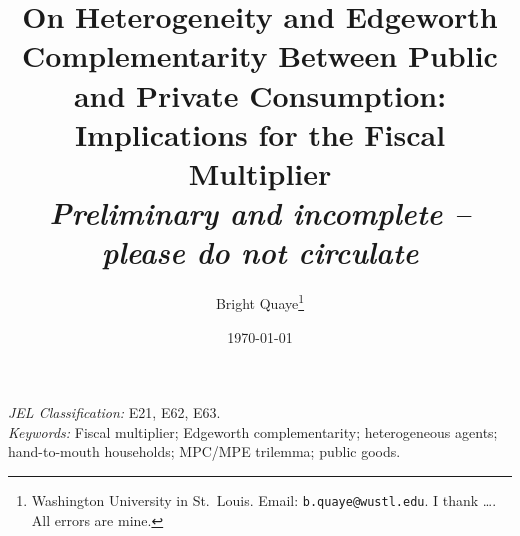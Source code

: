 \documentclass[11pt,letterpaper]{article}
\title{\textbf{On Heterogeneity and Edgeworth Complementarity Between
Public and Private Consumption:\\ Implications for the Fiscal Multiplier}\\[4pt]
\large\textit{Preliminary and incomplete -- please do not circulate}}
\author{Bright Quaye\thanks{Washington University in St.\ Louis. Email:
\texttt{b.quaye@wustl.edu}. I thank \dots. All errors are mine.}}
\date{\today}
\theoremstyle{remark}
\begin{document}
\maketitle


\vspace{8pt}\noindent\textit{JEL Classification:} E21, E62, E63.\\
\textit{Keywords:} Fiscal multiplier; Edgeworth complementarity; heterogeneous agents;
hand-to-mouth households; MPC/MPE trilemma; public goods.

\clearpage








\clearpage


\clearpage
\appendix





\end{document}
